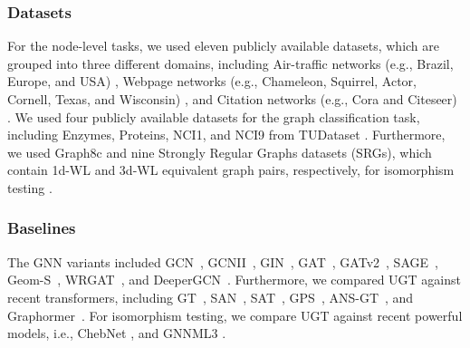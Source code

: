 \documentclass[oneside]{article}
\begin{document}
\subsubsection{Datasets}
For the node-level tasks, we used eleven publicly available datasets, which are grouped into three different domains, including Air-traffic networks (e.g., Brazil, Europe, and USA) \cite{ribeiro2017struc2vec}, Webpage networks (e.g., Chameleon, Squirrel, Actor, Cornell, Texas, and Wisconsin) \cite{DBLP:conf/iclr/PeiWCLY20}, and Citation networks (e.g., Cora and Citeseer) \cite{sen2008collective}.
We used four publicly available datasets for the graph classification task, including Enzymes, Proteins, NCI1, and NCI9 from TUDataset \cite{Morris_2020}. Furthermore, we used Graph8c and nine Strongly Regular Graphs datasets (SRGs), which contain 1d-WL and 3d-WL equivalent graph pairs, respectively, for isomorphism testing \cite{DBLP:conf/icml/BalcilarHGVAH21}.






















\subsubsection{Baselines} 
The GNN variants included GCN~\cite{DBLP:journals/corr/KipfW16}, GCNII~\cite{pmlr-v119-chen20v}, GIN~\cite{DBLP:conf/iclr/XuHLJ19}, GAT~\cite{velivckovic2017graph}, GATv2~\cite{DBLP:journals/corr/abs-2105-14491}, SAGE~\cite{DBLP:conf/nips/HamiltonYL17}, Geom-S~\cite{DBLP:conf/iclr/PeiWCLY20}, WRGAT~\cite{DBLP:conf/kdd/SureshBNLM21}, and DeeperGCN~\cite{DBLP:journals/corr/abs-2006-07739}.
Furthermore, we compared UGT against recent transformers, including GT~\cite{dwivedi2020generalization}, SAN~\cite{DBLP:conf/nips/KreuzerBHLT21}, SAT~\cite{DBLP:conf/icml/ChenOB22}, GPS~\cite{DBLP:conf/nips/RampasekGDLWB22}, ANS-GT~\cite{DBLP:conf/nips/Zhang0HL22}, and Graphormer~\cite{DBLP:conf/nips/YingCLZKHSL21}.
For isomorphism testing, we compare UGT against recent powerful models, i.e.,  ChebNet \cite{DBLP:conf/nips/DefferrardBV16}, and GNNML3 \cite{DBLP:conf/icml/BalcilarHGVAH21}.
\end{document}
